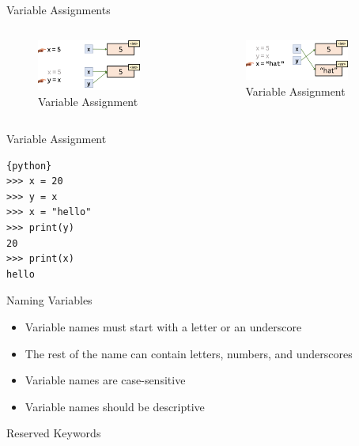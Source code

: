 \documentclass{beamer}
\begin{document}
\begin{frame}{Variable Assignments}
    \begin{columns}
        \begin{figure}
            \centering
            \includegraphics[width=0.8\textwidth]{pics/assignment.png}
            \caption{Variable Assignment}
        \end{figure}
        \begin{figure}
            \centering
            \includegraphics[width=0.8\textwidth]{pics/assignment2.png}
            \caption{Variable Assignment}
        \end{figure}
    \end{columns}
    
\end{frame}

\begin{frame}[fragile]{Variable Assignment}
    \begin{lstlisting}{python}
>>> x = 20
>>> y = x
>>> x = "hello"
>>> print(y)
20
>>> print(x)
hello
    \end{lstlisting}
\end{frame}


\begin{frame}{Naming Variables}
    \begin{itemize}
        \item Variable names must start with a letter or an underscore
        \item The rest of the name can contain letters, numbers, and underscores
        \item Variable names are case-sensitive
        \item Variable names should be descriptive
    \end{itemize}
\end{frame}

\begin{frame}{Reserved Keywords}
\end{frame}
\end{document}
